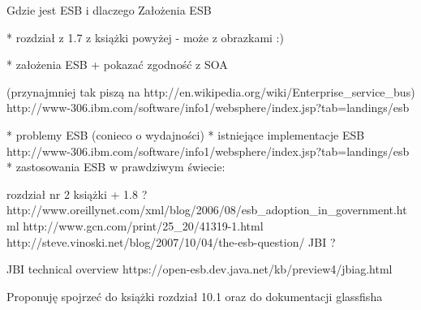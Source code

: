 																																				Gdzie jest ESB i dlaczego
																																				Założenia ESB

																																				    *
																																					      rozdział z 1.7 z książki powyżej - może z obrazkami :)

																																						      *
																																							        założenia ESB + pokazać zgodność z SOA

																																									(przynajmniej tak piszą na http://en.wikipedia.org/wiki/Enterprise_service_bus) http://www-306.ibm.com/software/info1/websphere/index.jsp?tab=landings/esb

																																									    *
																																										      problemy ESB (conieco o wydajności)
																																											      *
																																												        istniejące implementacje ESB http://www-306.ibm.com/software/info1/websphere/index.jsp?tab=landings/esb
																																														    *
																																															      zastosowania ESB w prawdziwym świecie:

																																																  rozdział nr 2 książki + 1.8 ? http://www.oreillynet.com/xml/blog/2006/08/esb_adoption_in_government.html http://www.gcn.com/print/25_20/41319-1.html http://steve.vinoski.net/blog/2007/10/04/the-esb-question/
																																																  JBI ?

																																																  JBI technical overview https://open-esb.dev.java.net/kb/preview4/jbiag.html

																																																  Proponuję spojrzeć do książki rozdział 10.1 oraz do dokumentacji glassfisha

